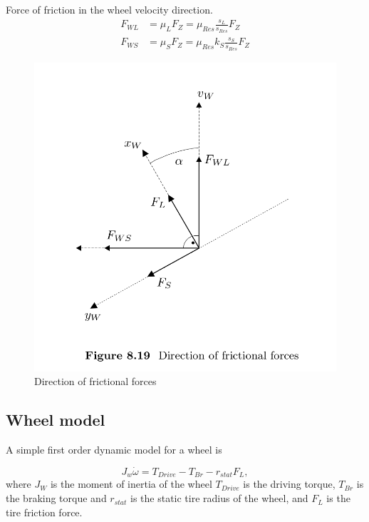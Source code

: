Force of friction in the wheel velocity direction.
\begin{align*}
  F_{WL} &= \mu_L F_Z = \mu_{Res} \frac{s_L}{s_{Res}} F_Z \\ 
  F_{WS} &= \mu_S F_Z = \mu_{Res} k_S \frac{s_S}{s_{Res}} F_Z
\end{align*}


\begin{figure}
    \centering
    \includegraphics[width=\textwidth]{draft/stolen-figures/direction-of-frictional-forces.png}
    \caption{Direction of frictional forces}
    \label{fig:friction-directions}
\end{figure}



\subsection{Wheel model}

A simple first order dynamic model for a wheel is

\begin{equation}
  J_w \dot{\omega} = T_{Drive} - T_{Br} - r_{stat}F_L,
\end{equation}
where $J_W$ is the moment of inertia of the wheel $T_{Drive}$ is the driving torque, $T_{Br}$ is the braking torque and $r_{stat}$ is the static tire radius of the wheel, and $F_L$ is the tire friction force.

